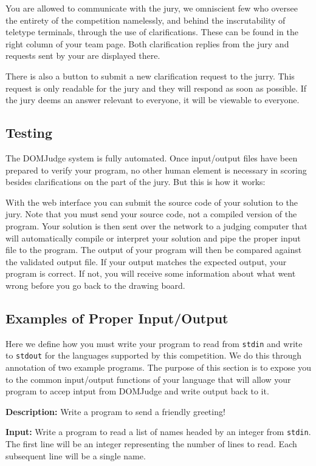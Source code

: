 \documentclass[a4paper]{article}
\begin{document}
You are allowed to communicate with the jury, we omniscient few who oversee the entirety of the competition namelessly, and behind the inscrutability of teletype terminals, through the use of clarifications. These can be found in the right column of your team page. Both clarification replies from the jury and requests sent by your are displayed there. 

There is also a button to submit a new clarification request to the jurry. This request is only readable for the jury and they will respond as soon as possible. If the jury deems an answer relevant to everyone, it will be viewable to everyone. 

\subsection{Testing}
The DOMJudge system is fully automated. Once input/output files have been prepared to verify your program, no other human element is necessary in scoring besides clarifications on the part of the jury. But this is how it works:

With the web interface you can submit the source code of your solution to the jury. Note that you must send your source code, not a compiled version of the program. Your solution is then sent over the network to a judging computer that will automatically compile or interpret your solution and pipe the proper input file to the program. The output of your program will then be compared against the validated output file. If your output matches the expected output, your program is correct. If not, you will receive some information about what went wrong before you go back to the drawing board. 

\subsection{Examples of Proper Input/Output}
Here we define how you must write your program to read from \texttt{stdin} and write to \texttt{stdout} for the languages supported by this competition. We do this through annotation of two example programs. The purpose of this section is to expose you to the common input/output functions of your language that will allow your program to accep intput from DOMJudge and write output back to it.
\newpage

\textbf{Description:} Write a program to send a friendly greeting! 

\textbf{Input:} Write a program to read a list of names headed by an integer from \texttt{stdin}. The first line will be an integer representing the number of lines to read. Each subsequent line will be a single name.
\end{document}

